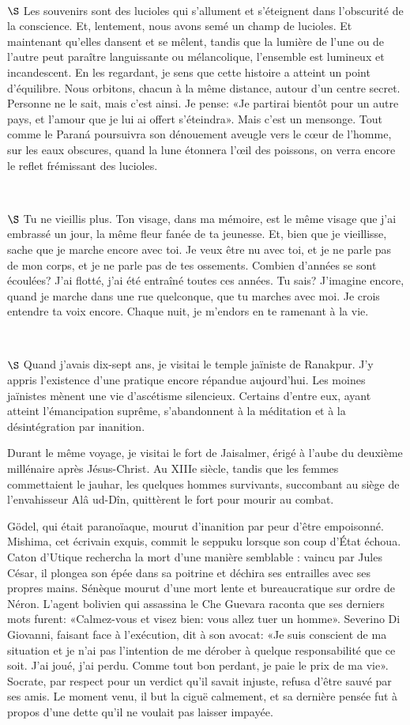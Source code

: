 \documentclass[a4paper, 12pt]{article}
\begin{document}
~ 

$\S$ Les souvenirs sont des lucioles qui s'allument et s'éteignent dans l'obscurité
de la conscience. Et, lentement, nous avons semé un champ de lucioles. Et
maintenant qu'elles dansent et se mêlent, tandis que la lumière de l'une ou
de l'autre peut paraître languissante ou mélancolique, l'ensemble est
lumineux et incandescent. En les regardant, je sens que cette histoire a atteint
un point d'équilibre. Nous orbitons, chacun à la même distance, autour d'un
centre secret. Personne ne le sait, mais c'est ainsi. Je pense: «Je partirai
bientôt pour un autre pays, et l'amour que je lui ai offert s'éteindra». Mais c'est
un mensonge. Tout comme le Paraná poursuivra son dénouement aveugle vers le cœur de
l'homme, sur les eaux obscures, quand la lune étonnera l’œil des poissons,
on verra encore le reflet frémissant des lucioles.

~ 

$\S$ Tu ne vieillis plus. Ton visage, dans ma mémoire, est le même visage que
j'ai embrassé un jour, la même fleur fanée de ta jeunesse. Et, bien que je
vieillisse, sache que je marche encore avec toi. Je veux être nu avec toi, et je ne
parle pas de mon corps, et je ne parle pas de tes ossements. Combien d'années se
sont écoulées? J'ai flotté, j'ai été entraîné toutes ces années. Tu sais?
J'imagine encore, quand je marche dans une rue quelconque, que tu marches avec
moi. Je crois entendre ta voix encore. Chaque nuit, je m'endors en te ramenant à
la vie.

~ 
\pagebreak

$\S$ Quand j'avais dix-sept ans, je visitai le temple jaïniste de Ranakpur. J'y
appris l'existence d'une pratique encore répandue aujourd'hui. Les moines
jaïnistes mènent une vie d'ascétisme silencieux. Certains d'entre eux, ayant
atteint l'émancipation suprême, s'abandonnent à la méditation et à la
désintégration par inanition.

Durant le même voyage, je visitai le fort de Jaisalmer, érigé à l'aube du
deuxième millénaire après Jésus-Christ. Au XIIIe siècle, tandis que les femmes
commettaient le jauhar, les quelques hommes survivants, succombant au siège de
l'envahisseur Alâ ud-Dîn, quittèrent le fort pour mourir au combat.

Gödel, qui était paranoïaque, mourut d'inanition par peur d'être empoisonné.
Mishima, cet écrivain exquis, commit le seppuku lorsque son coup d'État échoua.
Caton d'Utique rechercha la mort d'une manière semblable : vaincu par Jules
César, il plongea son épée dans sa poitrine et déchira ses entrailles avec ses
propres mains. Sénèque mourut d'une mort lente et bureaucratique sur ordre de
Néron. L'agent bolivien qui assassina le Che Guevara raconta que ses derniers
mots furent: «Calmez-vous et visez bien: vous allez tuer un homme». Severino Di
Giovanni, faisant face à l'exécution, dit à son avocat: «Je suis conscient de
ma situation et je n'ai pas l'intention de me dérober à quelque responsabilité
que ce soit. J'ai joué, j'ai perdu. Comme tout bon perdant, je paie le prix de
ma vie». Socrate, par respect pour un verdict qu'il savait injuste, refusa
d'être sauvé par ses amis. Le moment venu, il but la ciguë calmement, et sa
dernière pensée fut à propos d'une dette qu'il ne voulait pas laisser impayée.
\end{document}
